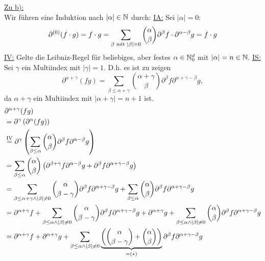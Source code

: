 \documentclass[12pt,a4paper]{article}
\begin{document}
\begin{lösung}
	\underline{Zu b):}\\
	Wir führen eine Induktion nach $|\alpha|\in\N$ durch:\nl
	\ul{IA:} Sei $|\alpha|=0$: 
	\begin{align*}
		\partial^{(0)}(f\cdot g)=f\cdot g=\sum\limits_{\beta\mit|\beta|=0}\binom{\alpha}{\beta}\partial^\beta f\cdot\partial^{\alpha-\beta} g=f\cdot g
	\end{align*}		
	\ul{IV:} Gelte die Leibniz-Regel für beliebiges, aber festes $\alpha\in\N_0^d$ mit $|\alpha|=n\in\N$.\nl
	\ul{IS:} Sei $\gamma$ ein Multiindex mit $|\gamma|=1$. D.h. es ist zu zeigen
	\begin{equation*}
		\partial^{\alpha + \gamma}(fg) = \displaystyle \sum_{\beta \leq \alpha + \gamma} \binom{\alpha + \gamma}{\beta}\partial^\beta f \partial^{\alpha+\gamma -\beta}g,
	\end{equation*}
	da $\alpha + \gamma$ ein Multiindex mit $|\alpha + \gamma|=n+1$ ist.
	\begin{align*}
		&\partial^{\alpha + \gamma}(fg)\\
		&= \partial^{\gamma}\left( \partial^\alpha(fg) \right)\\
		&\stackeq{\text{IV}} \partial^{\gamma}\left( \displaystyle \sum_{\beta \leq \alpha} \binom{\alpha }{\beta}\partial^\beta f \partial^{\alpha -\beta}g \right)\\
		&= \displaystyle \sum_{\beta \leq \alpha} \binom{\alpha }{\beta} \left( \partial^{\beta+\gamma} f \partial^{\alpha -\beta}g + \partial^{\beta} f \partial^{\alpha +\gamma -\beta}g \right)\\
		&= \displaystyle \sum_{\beta \leq \alpha + \gamma \land |\beta|\neq 0} \binom{\alpha }{\beta - \gamma} \partial^{\beta} f \partial^{\alpha +\gamma -\beta}g + \displaystyle \sum_{\beta \leq \alpha} \binom{\alpha }{\beta}  \partial^{\beta} f \partial^{\alpha +\gamma -\beta}g\\
		&= \partial^{\alpha +\gamma}f + \displaystyle \sum_{\beta \leq \alpha \land |\beta|\neq 0} \binom{\alpha }{\beta - \gamma} \partial^{\beta} f \partial^{\alpha +\gamma -\beta}g + \partial^{\alpha +\gamma}g + \displaystyle \sum_{\beta \leq \alpha \land |\beta|\neq 0 } \binom{\alpha }{\beta}  \partial^{\beta} f \partial^{\alpha +\gamma -\beta}g\\
		&= \partial^{\alpha +\gamma}f + \partial^{\alpha +\gamma}g + \displaystyle \sum_{\beta \leq \alpha \land |\beta|\neq 0} \underbrace{\left( \binom{\alpha }{\beta - \gamma} + \binom{\alpha }{\beta} \right)}_{=(*)} \partial^{\beta} f \partial^{\alpha +\gamma -\beta}g\\

\end{align*}
\end{lösung}
\end{document}
